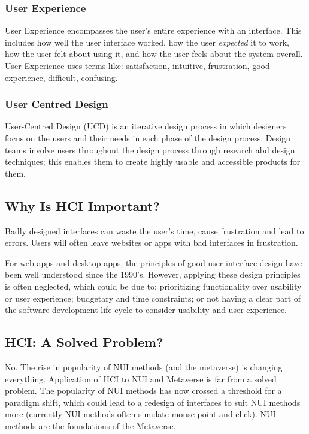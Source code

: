 \subsubsection{User Experience}
User Experience encompasses the user's entire experience with an interface. This includes how well the user interface worked, how the user \textit{expected} it to work, how the user felt about using it, and how the user feels about the system overall. User Experience uses terms like: satisfaction, intuitive, frustration, good experience, difficult, confusing.
\subsubsection{User Centred Design}
User-Centred Design (UCD) is an iterative design process in which designers focus on the users and their needs in each phase of the design process. Design teams involve users throughout the design process through research abd design techniques; this enables them to create highly usable and accessible products for them. 

\subsection{Why Is HCI Important?}
Badly designed interfaces can waste the user's time, cause frustration and lead to errors. Users will often leave websites or apps with bad interfaces in frustration. 

For web apps and desktop apps, the principles of good user interface design have been well understood since the 1990's. However, applying these design principles is often neglected, which could be due to: prioritizing functionality over usability or user experience; budgetary and time constraints; or not having a clear part of the software development life cycle to consider usability and user experience. 

\subsection{HCI: A Solved Problem?}
No. The rise in popularity of NUI methods (and the metaverse) is changing everything. Application of HCI to NUI and Metaverse is far from a solved problem. The popularity of NUI methods has now crossed a threshold for a paradigm shift, which could lead to a redesign of interfaces to suit NUI methods more (currently NUI methods often simulate mouse point and click). NUI methods are the foundations of the Metaverse. 

